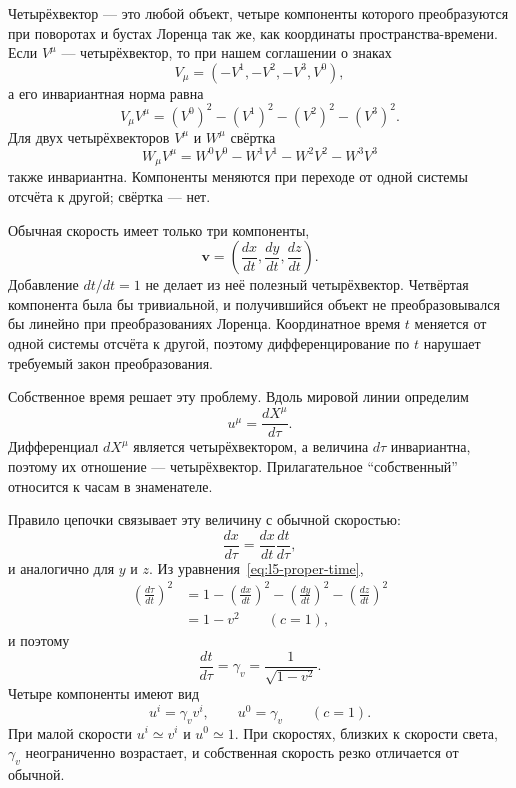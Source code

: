 Четырёхвектор — это любой объект, четыре компоненты которого преобразуются при поворотах и бустах Лоренца так же, как координаты пространства-времени. Если \(V^\mu\) — четырёхвектор, то при нашем соглашении о знаках
\begin{equation}
V_\mu=(-V^1,-V^2,-V^3,V^0),
\end{equation}
а его инвариантная норма равна
\begin{equation}
V_\mu V^\mu=(V^0)^2-(V^1)^2-(V^2)^2-(V^3)^2.
\end{equation}
Для двух четырёхвекторов \(V^\mu\) и \(W^\mu\) свёртка
\begin{equation}
W_\mu V^\mu
=W^0V^0-W^1V^1-W^2V^2-W^3V^3
\end{equation}
также инвариантна. Компоненты меняются при переходе от одной системы отсчёта к другой; свёртка — нет.

Обычная скорость имеет только три компоненты,
\begin{equation}
\mathbf v=\left(\frac{dx}{dt},\frac{dy}{dt},\frac{dz}{dt}\right).
\end{equation}
Добавление \(dt/dt=1\) не делает из неё полезный четырёхвектор. Четвёртая компонента была бы тривиальной, и получившийся объект не преобразовывался бы линейно при преобразованиях Лоренца. Координатное время \(t\) меняется от одной системы отсчёта к другой, поэтому дифференцирование по \(t\) нарушает требуемый закон преобразования.

Собственное время решает эту проблему. Вдоль мировой линии определим
\begin{equation}
u^\mu=\frac{dX^\mu}{d\tau}.
\label{eq:l5-four-velocity}
\end{equation}
Дифференциал \(dX^\mu\) является четырёхвектором, а величина \(d\tau\) инвариантна, поэтому их отношение — четырёхвектор. Прилагательное ``собственный'' относится к часам в знаменателе.

Правило цепочки связывает эту величину с обычной скоростью:
\begin{equation}
\frac{dx}{d\tau}=\frac{dx}{dt}\frac{dt}{d\tau},
\end{equation}
и аналогично для \(y\) и \(z\). Из уравнения~\eqref{eq:l5-proper-time},
\begin{align}
\left(\frac{d\tau}{dt}\right)^2
&=1-\left(\frac{dx}{dt}\right)^2
    -\left(\frac{dy}{dt}\right)^2
    -\left(\frac{dz}{dt}\right)^2\nonumber\\
&=1-v^2
\qquad(c=1),
\end{align}
и поэтому
\begin{equation}
\frac{dt}{d\tau}=\gamma_v=\frac{1}{\sqrt{1-v^2}}.
\end{equation}
Четыре компоненты имеют вид
\begin{equation}
u^i=\gamma_v v^i,
\qquad
u^0=\gamma_v
\qquad(c=1).
\label{eq:l5-four-velocity-components}
\end{equation}
При малой скорости \(u^i\simeq v^i\) и \(u^0\simeq1\). При скоростях, близких к скорости света,
\(\gamma_v\) неограниченно возрастает, и собственная скорость резко отличается от обычной.


